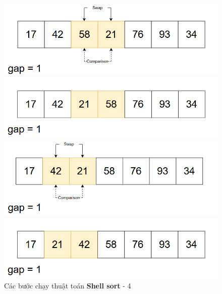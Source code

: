 \begin{figure}[H]
    \centering
    \includegraphics[width=1\linewidth]{img/shell_sort/13.png}
    \vspace{0.15cm}

    \includegraphics[width=1\linewidth]{img/shell_sort/14.png}
    \vspace{0.15cm}

    \includegraphics[width=1\linewidth]{img/shell_sort/15.png}
    \vspace{0.15cm}

    \includegraphics[width=1\linewidth]{img/shell_sort/16.png}
    \caption{Các bước chạy thuật toán \textbf{Shell sort} - 4}
\end{figure}

